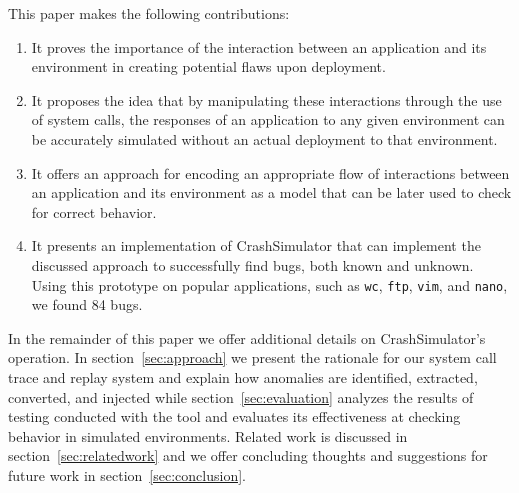 This paper makes the following contributions:

\begin{enumerate}
\item{It proves the importance of the interaction between an application and
    its environment in creating potential flaws upon deployment.}
\item{It proposes the idea that by manipulating these interactions through
    the use of system calls, the responses of an application to any given
    environment can be accurately simulated without an actual deployment to
    that environment.}
\item{It offers an approach for encoding an appropriate flow of
    interactions between an application and its environment as a model that
    can be later used to check for correct behavior.}
\item{It presents an implementation of CrashSimulator that can implement the
    discussed approach to successfully find bugs, both known and unknown. 
    Using this prototype on popular applications, such as {\tt wc}, {\tt ftp}, 
    {\tt vim}, and {\tt nano}, we found 84 bugs.}
\end{enumerate}

In the remainder of this paper we
offer additional details on CrashSimulator's operation.
In section~\ref{sec:approach} we present the rationale for our system call trace
and replay system and explain how anomalies are identified, extracted,
converted, and injected while section~\ref{sec:evaluation} analyzes the results
of testing conducted with the tool and evaluates its effectiveness at checking
behavior in simulated environments.  Related work is discussed in
section~\ref{sec:relatedwork} and we offer concluding thoughts and suggestions
for future work in section~\ref{sec:conclusion}.


